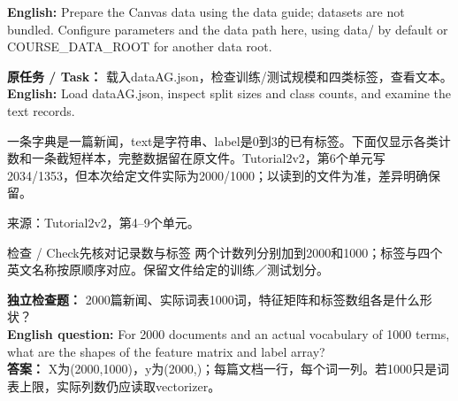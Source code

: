 \textbf{English:} Prepare the Canvas data using the data guide; datasets are not bundled. Configure parameters and the data path here, using data/ by default or COURSE\_DATA\_ROOT for another data root.











\textbf{原任务 / Task：} 载入dataAG.json，检查训练/测试规模和四类标签，查看文本。\\

\textbf{English:} Load dataAG.json, inspect split sizes and class counts, and examine the text records.


一条字典是一篇新闻，text是字符串、label是0到3的已有标签。下面仅显示各类计数和一条截短样本，完整数据留在原文件。Tutorial2v2，第6个单元写2034/1353，但本次给定文件实际为2000/1000；以读到的文件为准，差异明确保留。


来源：Tutorial2v2，第4–9个单元。








\begin{StudyBlock}{检查 / Check}{先核对记录数与标签}
两个计数列分别加到2000和1000；标签与四个英文名称按原顺序对应。保留文件给定的训练／测试划分。
\end{StudyBlock}


\textbf{独立检查题：} 2000篇新闻、实际词表1000词，特征矩阵和标签数组各是什么形状？\\

\textbf{English question:} For 2000 documents and an actual vocabulary of 1000 terms, what are the shapes of the feature matrix and label array?\\

\textbf{答案：} X为(2000,1000)，y为(2000,)；每篇文档一行，每个词一列。若1000只是词表上限，实际列数仍应读取vectorizer。\\

